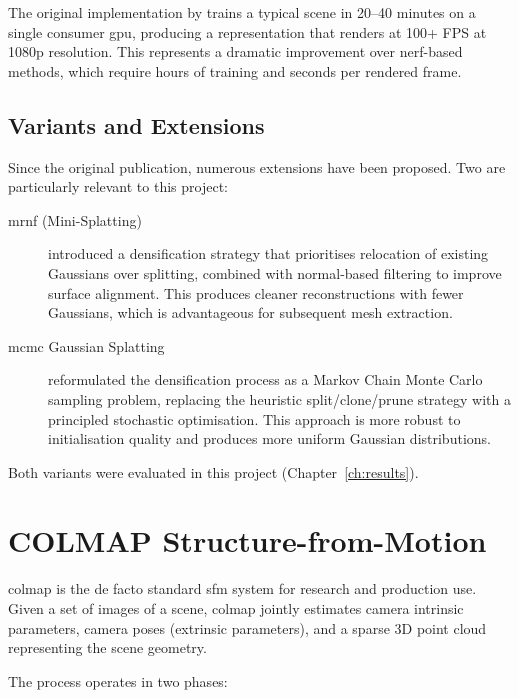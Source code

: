 The original implementation by \textcite{Kerbl2023} trains a typical scene in 20--40 minutes on a single consumer \acrshort{gpu}, producing a representation that renders at 100+ FPS at 1080p resolution. This represents a dramatic improvement over \acrshort{nerf}-based methods, which require hours of training and seconds per rendered frame.

\subsection{Variants and Extensions}

Since the original publication, numerous extensions have been proposed. Two are particularly relevant to this project:

\begin{description}
  \item[\acrshort{mrnf} (Mini-Splatting)] \textcite{Fang2024} introduced a densification strategy that prioritises relocation of existing Gaussians over splitting, combined with normal-based filtering to improve surface alignment. This produces cleaner reconstructions with fewer Gaussians, which is advantageous for subsequent mesh extraction.

  \item[\acrshort{mcmc} Gaussian Splatting] \textcite{Kheradmand2024} reformulated the densification process as a Markov Chain Monte Carlo sampling problem, replacing the heuristic split/clone/prune strategy with a principled stochastic optimisation. This approach is more robust to initialisation quality and produces more uniform Gaussian distributions.
\end{description}

Both variants were evaluated in this project (Chapter~\ref{ch:results}).

\section{COLMAP Structure-from-Motion}
\label{sec:tech-sfm}

\acrshort{colmap} \parencite{Schoenberger2016sfm, Schoenberger2016mvs} is the de facto standard \acrlong{sfm} system for research and production use. Given a set of images of a scene, \acrshort{colmap} jointly estimates camera intrinsic parameters, camera poses (extrinsic parameters), and a sparse 3D point cloud representing the scene geometry.

The process operates in two phases:

